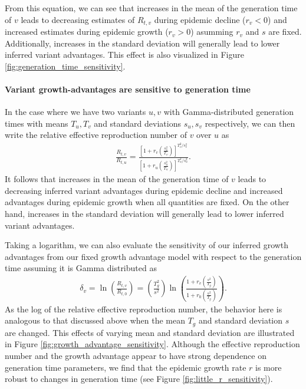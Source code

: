 \documentclass[11pt,oneside,letterpaper]{article}
\begin{document}
From this equation, we can see that increases in the mean of the generation time of $v$ leads to decreasing estimates of $R_{t,v}$ during epidemic decline ($r_{v} < 0$) and increased estimates during epidemic growth ($r_{v} > 0$) asumming $r_{v}$ and $s$ are fixed.
Additionally, increases in the standard deviation will generally lead to lower inferred variant advantages. 
This effect is also visualized in Figure \ref{fig:generation_time_sensitivity}.

\paragraph{Variant growth-advantages are sensitive to generation time}%

In the case where we have two variants $u, v$ with Gamma-distributed generation times with means $T_{u}, T_{v}$ and standard deviations $s_{u}, s_{v}$ respectively, we can then write the relative effective reproduction number of $v$ over $u$ as
\begin{align*}
\frac{R_{t,v}}{R_{t,u}} = \frac{\left[1 + r_{v}  \left(\frac{s_{v}^{2}}{T_{v}}\right)\right]^{T_{v}^{2} / s_{v}^{2}}}{\left[1 + r_{u} \left(\frac{s_{u}^{2}}{T_{u}}\right)\right]^{T_{u}^{2} / s_{u}^{2}}}.
\end{align*}
It follows that increases in the mean of the generation time of $v$ leads to decreasing inferred variant advantages during epidemic decline and increased advantages during epidemic growth when all quantities are fixed.
On the other hand, increases in the standard deviation will generally lead to lower inferred variant advantages. 

Taking a logarithm, we can also evaluate the sensitivity of our inferred growth advantages from our fixed growth advantage model with respect to the generation time assuming it is Gamma distributed as
\begin{align*}
 \delta_{v}  = \ln \left( \frac{R_{t,v}}{R_{t,0}} \right) = \left( \frac{T_{g}^{2}}{s^{2}} \right)  \ln \left( \frac{1 + r_{v}  \left(\frac{s^{2}}{T_{g}}\right)}{1 + r_{0} \left(\frac{s^{2}}{T_{g}}\right) } \right).
\end{align*}
As the log of the relative effective reproduction number, the behavior here is analogous to that discussed above when the mean $T_{g}$ and standard deviation $s$ are changed.
This effects of varying mean and standard deviation are illustrated in Figure \ref{fig:growth_advantage_sensitivity}.
Although the effective reproduction number and the growth advantage appear to have strong dependence on generation time parameters, we find that the epidemic growth rate $r$ is more robust to changes in generation time (see Figure \ref{fig:little_r_sensitivity}).
\end{document}
